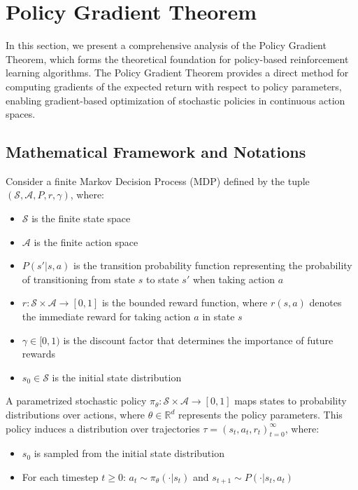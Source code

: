 \section{Policy Gradient Theorem}

In this section, we present a comprehensive analysis of the Policy Gradient Theorem, which forms the theoretical foundation for policy-based reinforcement learning algorithms. The Policy Gradient Theorem provides a direct method for computing gradients of the expected return with respect to policy parameters, enabling gradient-based optimization of stochastic policies in continuous action spaces.

\subsection{Mathematical Framework and Notations}

Consider a finite Markov Decision Process (MDP) defined by the tuple $(\mathcal{S}, \mathcal{A}, P, r, \gamma)$, where:
\begin{itemize}
    \item $\mathcal{S}$ is the finite state space
    \item $\mathcal{A}$ is the finite action space  
    \item $P(s'|s, a)$ is the transition probability function representing the probability of transitioning from state $s$ to state $s'$ when taking action $a$
    \item $r: \mathcal{S} \times \mathcal{A} \rightarrow [0, 1]$ is the bounded reward function, where $r(s, a)$ denotes the immediate reward for taking action $a$ in state $s$
    \item $\gamma \in [0, 1)$ is the discount factor that determines the importance of future rewards
    \item $s_0 \in \mathcal{S}$ is the initial state distribution
\end{itemize}

A parametrized stochastic policy $\pi_{\theta}: \mathcal{S} \times \mathcal{A} \rightarrow [0, 1]$ maps states to probability distributions over actions, where $\theta \in \mathbb{R}^d$ represents the policy parameters. This policy induces a distribution over trajectories $\tau = (s_t, a_t, r_t)_{t=0}^{\infty}$, where:
\begin{itemize}
    \item $s_0$ is sampled from the initial state distribution
    \item For each timestep $t \geq 0$: $a_t \sim \pi_{\theta}(\cdot|s_t)$ and $s_{t+1} \sim P(\cdot|s_t, a_t)$
\end{itemize}

